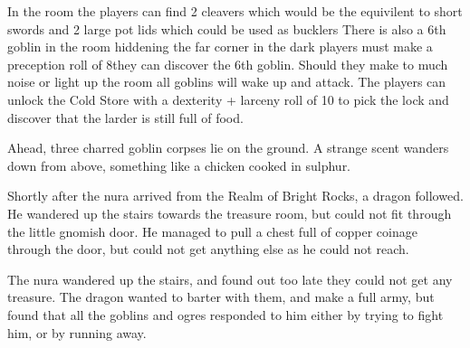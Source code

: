 \begin{multicols}{2}

In the room the players can find 2 cleavers which would be the equivilent to short swords and 2 large pot lids which could be used as bucklers
There is also a 6th goblin in the room hiddening the far corner in the dark players must make a preception roll of 8they can discover the 6th goblin.
Should they make to much noise or light up the room all goblins will wake up and attack.
The players can unlock the Cold Store with a dexterity + larceny roll of 10 to pick the lock and discover that the larder is still full of food.  






\begin{boxtext}

	Ahead, three charred goblin corpses lie on the ground.
	A strange scent wanders down from above, something like a chicken cooked in sulphur.

\end{boxtext}


\begin{exampletext}

	Shortly after the nura arrived from the Realm of Bright Rocks, a dragon followed.
	He wandered up the stairs towards the treasure room, but could not fit through the little gnomish door.
	He managed to pull a chest full of copper coinage through the door, but could not get anything else as he could not reach.

	The nura wandered up the stairs, and found out too late they could not get any treasure.
	The dragon wanted to barter with them, and make a full army, but found that all the goblins and ogres responded to him either by trying to fight him, or by running away.


\end{exampletext}
\end{multicols}
